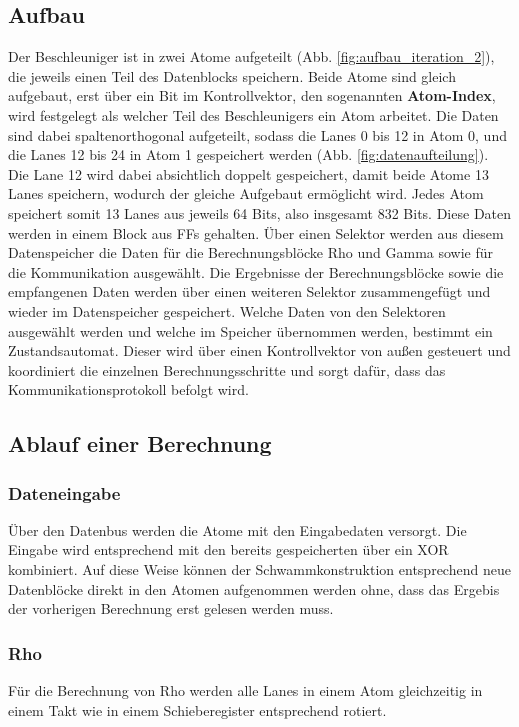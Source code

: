 \subsection{Aufbau}
Der Beschleuniger ist in zwei Atome aufgeteilt (Abb. \ref{fig:aufbau_iteration_2}), die jeweils einen Teil des Datenblocks speichern. Beide Atome sind gleich aufgebaut, erst über ein Bit im Kontrollvektor,
den sogenannten \textbf{Atom-Index}, wird festgelegt als welcher Teil des Beschleunigers ein Atom arbeitet. Die Daten sind dabei spaltenorthogonal aufgeteilt, sodass die Lanes 0 bis 12 in Atom 0,
und die Lanes 12 bis 24 in Atom 1 gespeichert werden (Abb. \ref{fig:datenaufteilung}). Die Lane 12 wird dabei absichtlich doppelt gespeichert,
damit beide Atome 13 Lanes speichern, wodurch der gleiche Aufgebaut ermöglicht wird. Jedes Atom speichert somit 13 Lanes aus jeweils 64 Bits, also insgesamt 832 Bits.
Diese Daten werden in einem Block aus FFs gehalten. Über einen Selektor werden aus diesem Datenspeicher die Daten für die Berechnungsblöcke Rho und Gamma sowie für die Kommunikation ausgewählt.
Die Ergebnisse der Berechnungsblöcke sowie die empfangenen Daten werden über einen weiteren Selektor zusammengefügt und wieder im Datenspeicher gespeichert.
Welche Daten von den Selektoren ausgewählt werden und welche im Speicher übernommen werden, bestimmt ein Zustandsautomat. Dieser wird über einen Kontrollvektor von außen gesteuert
und koordiniert die einzelnen Berechnungsschritte und sorgt dafür, dass das Kommunikationsprotokoll befolgt wird.

\subsection{Ablauf einer Berechnung}
\subsubsection{Dateneingabe}
Über den Datenbus werden die Atome mit den Eingabedaten versorgt. Die Eingabe wird entsprechend mit den bereits gespeicherten über ein XOR kombiniert.
Auf diese Weise können der Schwammkonstruktion entsprechend neue Datenblöcke direkt in den Atomen aufgenommen werden ohne,
dass das Ergebis der vorherigen Berechnung erst gelesen werden muss.
\subsubsection{Rho}
Für die Berechnung von Rho werden alle Lanes in einem Atom gleichzeitig in einem Takt wie in einem Schieberegister entsprechend rotiert.
